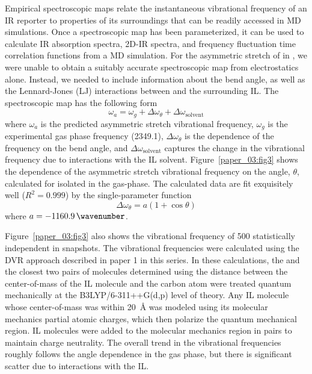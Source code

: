\documentclass[%
  class = book,%
  crop = false,%
  float = true,%
  multi = true,%
  preview = false,%
]{standalone}
\begin{document}
Empirical spectroscopic maps relate the instantaneous vibrational frequency of an IR reporter to properties of its surroundings that can be readily accessed in MD simulations.\cite{lin_water_2009-1,Terranova2014,malolepsza_empirical_2014} Once a spectroscopic map has been parameterized, it can be used to calculate IR absorption spectra, 2D-IR spectra, and frequency fluctuation time correlation functions from a MD simulation. For the asymmetric stretch of  in \ce{[C4C1im][PF6]}, we were unable to obtain a suitably accurate spectroscopic map from electrostatics alone. Instead, we needed to include information about the  bend angle, as well as the Lennard-Jones (LJ) interactions between  and the surrounding IL. The spectroscopic map has the following form
\begin{equation}
  \label{paper_03:eq:1}
  \omega_{a} = \omega_{g} + \Delta\omega_{\theta} + \Delta\omega_{\text{solvent}}
\end{equation}
where \(\omega_{a}\) is the predicted  asymmetric stretch vibrational frequency, \(\omega_{g}\) is the experimental gas phase frequency (\SI{2349.1}{\wavenumber}), \(\Delta\omega_{\theta}\) is the dependence of the frequency on the  bend angle, and \(\Delta\omega_{\text{solvent}}\) captures the change in the vibrational frequency due to interactions with the IL solvent. Figure~\ref{paper_03:fig3} shows the dependence of the  asymmetric stretch vibrational frequency on the  angle, \(\theta\), calculated for  isolated in the gas-phase. The calculated data are fit exquisitely well (\(R^{2} = 0.999\)) by the single-parameter function
\begin{equation}
  \label{paper_03:eq:2}
  \Delta\omega_{\theta} = a(1 + \cos{\theta})
\end{equation}
where \(a = \SI{-1160.9}{\wavenumber}\).

Figure~\ref{paper_03:fig3} also shows the vibrational frequency of \num{500} statistically independent  in \ce{[C4C1im][PF6]} snapshots. The vibrational frequencies were calculated using the DVR approach described in paper 1 in this series. In these calculations, the  and the closest two pairs of \ce{[C4C1im][PF6]} molecules \textemdash{} determined using the distance between the center-of-mass of the IL molecule and the  carbon atom \textemdash{} were treated quantum mechanically at the B3LYP/6-311++G(d,p) level of theory. Any IL molecule whose center-of-mass was within \SI{20}{\angstrom} was modeled using its molecular mechanics partial atomic charges, which then polarize the quantum mechanical region. IL molecules were added to the molecular mechanics region in pairs to maintain charge neutrality. The overall trend in the vibrational frequencies roughly follows the angle dependence in the gas phase, but there is significant scatter due to interactions with the IL.
\end{document}
